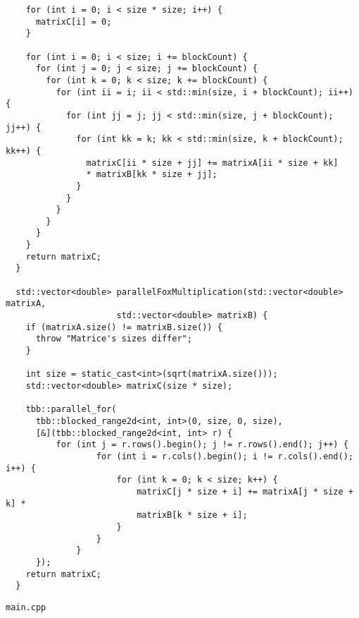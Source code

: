 \documentclass{article}
\begin{document}
\begin{lstlisting}
    for (int i = 0; i < size * size; i++) {
      matrixC[i] = 0;
    }

    for (int i = 0; i < size; i += blockCount) {
      for (int j = 0; j < size; j += blockCount) {
        for (int k = 0; k < size; k += blockCount) {
          for (int ii = i; ii < std::min(size, i + blockCount); ii++) {
            for (int jj = j; jj < std::min(size, j + blockCount); jj++) {
              for (int kk = k; kk < std::min(size, k + blockCount); kk++) {
                matrixC[ii * size + jj] += matrixA[ii * size + kk]
                * matrixB[kk * size + jj];
              }
            }
          }
        }
      }
    }
    return matrixC;
  }

  std::vector<double> parallelFoxMultiplication(std::vector<double> matrixA,
                      std::vector<double> matrixB) {
    if (matrixA.size() != matrixB.size()) {
      throw "Matrice's sizes differ";
    }

    int size = static_cast<int>(sqrt(matrixA.size()));
    std::vector<double> matrixC(size * size);

    tbb::parallel_for(
      tbb::blocked_range2d<int, int>(0, size, 0, size),
      [&](tbb::blocked_range2d<int, int> r) {
          for (int j = r.rows().begin(); j != r.rows().end(); j++) {
                  for (int i = r.cols().begin(); i != r.cols().end(); i++) {
                      for (int k = 0; k < size; k++) {
                          matrixC[j * size + i] += matrixA[j * size + k] *
                          matrixB[k * size + i];
                      }
                  }
              }
      });
    return matrixC;
  }
\end{lstlisting}
\par
\lstinline$main.cpp$
\end{document}
